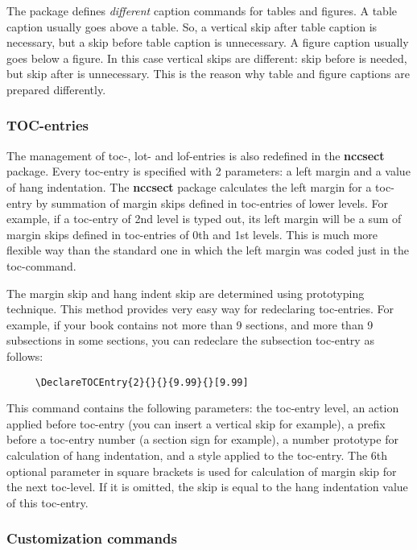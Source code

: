 \documentclass[11pt]{ncc}
\newcommand*\package[1]{\textbf{#1}}
\begin{document}
The package defines \textit{different} caption commands for
tables and figures. A table caption usually goes above a table.
So, a vertical skip after table caption is necessary, but a skip
before table caption is unnecessary. A figure caption usually
goes below a figure. In this case vertical skips are different:
skip before is needed, but skip after is unnecessary. This is the
reason why table and figure captions are prepared differently.

\subsubsection{TOC-entries}

The management of toc-, lot- and lof-entries is also redefined in
the \package{nccsect} package. Every toc-entry is specified with
2 parameters: a left margin and a value of hang indentation. The
\package{nccsect} package calculates the left margin for a
toc-entry by summation of margin skips defined in toc-entries of
lower levels. For example, if a toc-entry of 2nd level is typed
out, its left margin will be a sum of margin skips defined in
toc-entries of 0th and 1st levels. This is much more flexible way
than the standard one in which the left margin was coded just in
the toc-command.

The margin skip and hang indent skip are determined using
prototyping technique. This method provides very easy way for
redeclaring toc-entries. For example, if your book contains not
more than 9 sections, and more than 9 subsections in some
sections, you can redeclare the subsection toc-entry as follows:
\begin{verbatim}
     \DeclareTOCEntry{2}{}{}{9.99}{}[9.99]
\end{verbatim}
This command contains the following parameters: the toc-entry
level, an action applied before toc-entry (you can insert a
vertical skip for example), a prefix before a toc-entry number (a
section sign for example), a number prototype for calculation of
hang indentation, and a style applied to the toc-entry. The 6th
optional parameter in square brackets is used for calculation of
margin skip for the next toc-level. If it is omitted,
the skip is equal to the hang indentation value of this toc-entry.

\subsubsection{Customization commands}
\end{document}
